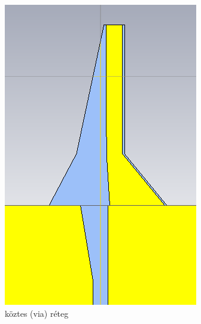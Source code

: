 \begin{figure}[h]
\begin{subfigure}[b]{0.3\textwidth}
		\includegraphics[width=\textwidth]{kep/results/balun_2.png}
		\caption{köztes (via) réteg}
	\end{subfigure}
	\hfill
	\begin{subfigure}[b]{0.3\textwidth}
		\centering

\end{subfigure}
\end{figure}
